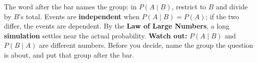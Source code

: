 \documentclass[12pt]{article}
\begin{document}
\vspace{0.14in}

\begin{remindbox}
\small
The word after the bar names the group: in $P(A \mid B)$, restrict to $B$ and divide by $B$'s total.
Events are \textbf{independent} when $P(A \mid B) = P(A)$; if the two differ, the events are
dependent. By the \textbf{Law of Large Numbers}, a long \textbf{simulation} settles near the actual
probability. \textbf{Watch out:} $P(A \mid B)$ and $P(B \mid A)$ are different numbers. Before you
decide, name the group the question is about, and put that group after the bar.
\end{remindbox}
\end{document}

